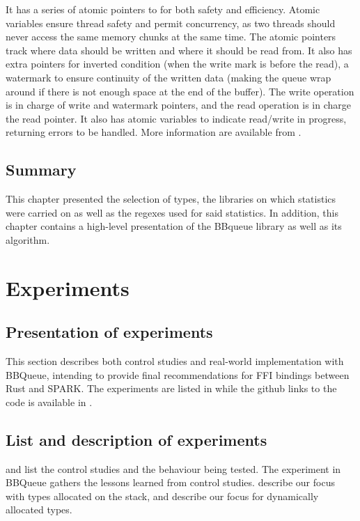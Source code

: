 \documentclass[nomenclature, english, bibtex]{kththesis}
\begin{document}
It has a series of atomic pointers to for both safety and efficiency. Atomic variables ensure thread safety and permit concurrency, as two threads should never access the same memory chunks at the same time. The atomic pointers track where data should be written and where it should be read from. It also has extra pointers for inverted condition (when the write mark is before the read), a watermark to ensure continuity of the written data (making the queue wrap around if there is not enough space at the end of the buffer).  The write operation is in charge of write and watermark pointers, and the read operation is in charge the read pointer. It also has atomic variables to indicate read/write in progress, returning errors to be handled. More information are available from \cite{chouteau_rust_2021, munns_design_2019}.

\section{Summary}

This chapter presented the selection of types, the libraries on which statistics were carried on as well as the regexes used for said statistics. In addition, this chapter contains a high-level presentation of the BBqueue library as well as its algorithm.

\cleardoublepage
\chapter{Experiments}
\label{ch:whatYouDid}

\section{Presentation of experiments}

This section describes both control studies and real-world implementation with BBQueue, intending to provide final recommendations for FFI bindings between Rust and SPARK. The experiments are listed in 
while the github links to the code is available in . 

\section{List and description of experiments}
\label{tab:listexperiments}

 and  list the control studies and the behaviour being tested. The experiment in BBQueue gathers the lessons learned from control studies. describe our focus with types allocated on the stack, and  describe our focus for dynamically allocated types.
\end{document}

